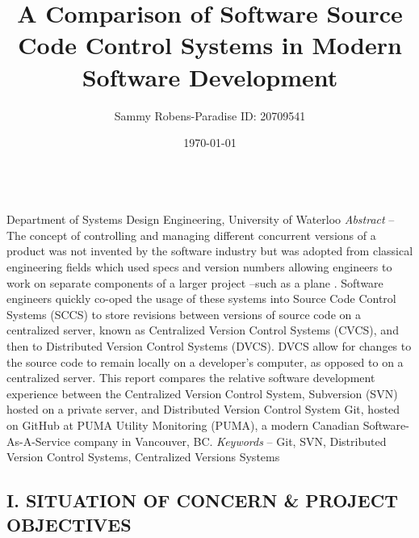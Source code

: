 \documentclass{article}
\title{A Comparison of Software Source Code Control Systems in Modern Software Development}
\author{Sammy Robens-Paradise ID: 20709541}
\date{\today}
\begin{document}
\maketitle
{}\\
\centering
Department of Systems Design Engineering, University of Waterloo
\justify
\textit{Abstract} – The concept of controlling and managing different concurrent versions of a product was not invented by the software industry but was adopted from classical engineering fields which used specs and version numbers allowing engineers to work on separate components of a larger project –such as a plane \cite{history-of-version-control}. Software engineers quickly co-oped the usage of these systems into Source Code Control Systems (SCCS) to store revisions between versions of source code on a centralized server, known as Centralized Version Control Systems (CVCS), and then to Distributed Version Control Systems (DVCS). DVCS allow for changes to the source code to remain locally on a developer’s computer, as opposed to on a centralized server. This report compares the relative software development experience between the Centralized Version Control System, Subversion (SVN) hosted on a private server, and Distributed Version Control System Git, hosted on GitHub at PUMA Utility Monitoring (PUMA), a modern Canadian Software-As-A-Service company in Vancouver, BC.
\justify
\textit{Keywords} – Git, SVN, Distributed Version Control Systems, Centralized Versions Systems
\begin{center}
     \section*{I. SITUATION OF CONCERN \& PROJECT OBJECTIVES} 
\end{center}
\end{document}
